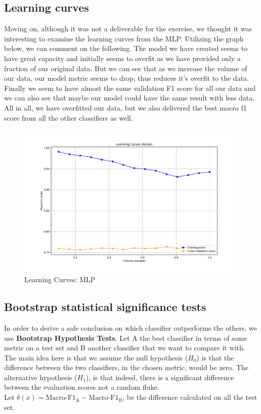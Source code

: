 \documentclass[10pt]{article}
\begin{document}
\subsection*{Learning curves }
Moving on, although it was not a deliverable for the exercise, we thought it was interesting to examine the learning curves from the MLP. Utilizing the graph below, we can comment on the following. The model we have created seems to have great capacity and initially seems to overfit as we have provided only a fraction of our original data. But we can see that as we increase the volume of our data, our model metric seems to drop, thus reduces it's overfit to the data. Finally we seem to have almost the same validation F1 score for all our data and we can also see that maybe our model could have the same result with less data. All in all, we have overfitted our data, but we also delivered the best macro f1 score from all the other classifiers as well.

\begin{figure}[H]
\caption{Learning Curves: MLP }
\includegraphics[width=\textwidth]{Learning Curves (Keras).pdf}
\end{figure}

\newpage
\subsection*{Bootstrap statistical significance tests }

In order to derive a safe conclusion on which classifier outperforms the others, we use \textbf{Bootstrap Hypothesis Tests}.
Let A the best classifier in terms of some metric on a test set and B another classifier that we want to compare it with. 
The main idea here is that we assume the null hypothesis ($H_0$) is that the difference between the two classifiers, in the chosen metric, would be zero. 
The alternative hypothesis ($H_1$), is that indeed, there is a significant difference between the evaluation scores not a random fluke. \\
Let $\delta(x) = \text{Macro-F1}_\text{A} - \text{Macro-F1}_\text{B}$, be the difference calculated on all the test set.\\
\end{document}
